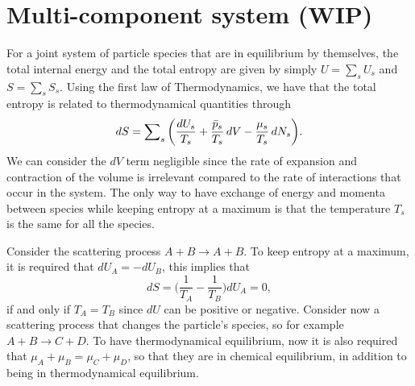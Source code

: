 \section{Multi-component system (WIP)}
For a joint system of particle species that are in equilibrium by themselves, the total internal energy and the total entropy are given by simply $U = \sum_sU_s$ and $S = \sum_sS_s$. Using the first law of Thermodynamics, we have that the total entropy is related to thermodynamical quantities through
\begin{equation}
    dS = \sum\nolimits_s\bigg(\frac{dU_s}{T_s} + \frac{\bar{p}_s}{T_s}\,dV - \frac{\mu_s}{T_s}\,dN_s\bigg).
\end{equation}
We can consider the $dV$ term negligible since the rate of expansion and contraction of the volume is irrelevant compared to the rate of interactions that occur in the system. The only way to  have exchange of energy and momenta between species while keeping entropy at a maximum is that the temperature $T_s$ is the same for all the species.

Consider the scattering process $A + B \to A + B$. To keep entropy at a maximum, it is required that $dU_A = -dU_B$, this implies that 
\begin{equation}
    dS = \bigg(\frac{1}{T_A} - \frac{1}{T_B}\bigg)dU_A = 0,
\end{equation}
if and only if $T_A = T_B$ since $dU$ can be positive or negative. Consider now a scattering process that changes the particle's species, so for example $A + B \to C + D$. To have thermodynamical equilibrium, now it is also required that $\mu_A + \mu_B = \mu_C + \mu_D$, so that they are in chemical equilibrium, in addition to being in thermodynamical equilibrium. 

